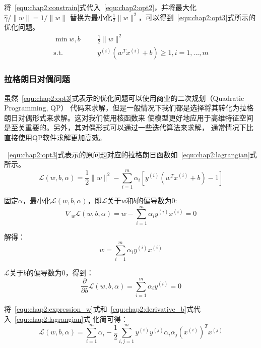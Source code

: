 将~\ref{equ:chap2:constrain}式代入~\ref{equ:chap2:opt2}，并将最大化$\hat{\gamma}/\|w\|=1/\|w\|$
替换为最小化$\frac{1}{2}\|w\|^2$，可以得到~\ref{equ:chap2:opt3}式所示的优化问题。
\begin{equation}
  \label{equ:chap2:opt3}
  \begin{aligned}
    \min{w,b} &
    & & \frac{1}{2}\|w\|^2 \\
    \text{s.t.} &
    & & y^{(i)}\left(w^Tx^{(i)}+b\right)\geq 1, i=1,...,m
  \end{aligned}
\end{equation}

\subsubsection{拉格朗日对偶问题}

虽然~\ref{equ:chap2:opt3}式表示的优化问题可以使用商业的二次规划（Quadratic Programming, QP）
代码来求解，但是一般情况下我们都是选择将其转化为拉格朗日对偶形式来求解。这对我们使用核函数来
使模型更好地应用于高维特征空间是至关重要的。另外，其对偶形式可以通过一些迭代算法来求解，
通常情况下比直接使用QP软件求解更加高效。

~\ref{equ:chap2:opt3}式表示的原问题对应的拉格朗日函数如~\ref{equ:chap2:lagrangian}式所示。
\begin{equation}
  \label{equ:chap2:lagrangian}
  \mathcal{L}(w,b,\alpha)=\frac{1}{2}\|w\|^2-\sum_{i=1}^m \alpha_i\left[y^{(i)}\left(w^Tx^{(i)}+b\right)-1\right]
\end{equation}

固定$\alpha$，最小化$\mathcal{L}(w,b,\alpha)$，即$\mathcal{L}$关于$w$和$b$的偏导数为0:
\begin{equation}
  \label{equ:chap2:derivative_w}
  \nabla_w\mathcal{L}(w,b,\alpha)=w-\sum_{i=1}^{m}\alpha_iy^{(i)}x^{(i)}=0
\end{equation}

解得：
\begin{equation}
  \label{equ:chap2:expression_w}
  w=\sum_{i=1}^{m}\alpha_iy^{(i)}x^{(i)}
\end{equation}

$\mathcal{L}$关于$b$的偏导数为0，得到：
\begin{equation}
  \label{equ:chap2:derivative_b}
  \frac{\partial}{\partial b}\mathcal{L}(w,b,\alpha)=\sum_{i=1}^m\alpha_iy^{(i)}=0
\end{equation}

将~\ref{equ:chap2:expression_w}式和~\ref{equ:chap2:derivative_b}式代入~\ref{equ:chap2:lagrangian}式
化简可得：
\begin{equation}
  \label{equ:chap2:dual_objective}
  \mathcal{L}(w,b,\alpha)=\sum_{i=1}^m\alpha_i-\frac{1}{2}\sum_{i,j=1}^m
  y^{(i)}y^{(j)}\alpha_i\alpha_j(x^{(i)})^Tx^{(j)}
\end{equation}

